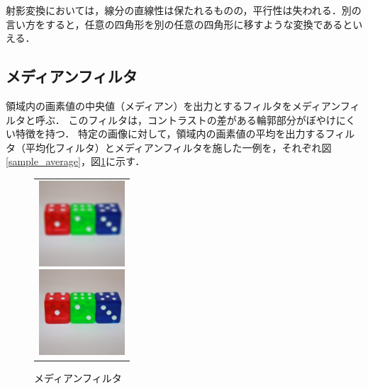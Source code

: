 \documentclass[openright]{nitocs}
\numberwithin{equation}{section}
\begin{document}
                射影変換においては，線分の直線性は保たれるものの，平行性は失われる．別の言い方をすると，任意の四角形を別の任意の四角形に移すような変換であるといえる．

        \subsection{メディアンフィルタ}
            領域内の画素値の中央値（メディアン）を出力とするフィルタをメディアンフィルタと呼ぶ．
            このフィルタは，コントラストの差がある輪郭部分がぼやけにくい特徴を持つ．
            特定の画像に対して，領域内の画素値の平均を出力するフィルタ（平均化フィルタ）とメディアンフィルタを施した一例を，それぞれ図\ref{sample_average}，図\ref{sample_median}に示す．
            \begin{figure}[htbp] %
                \begin{center}
                  \begin{tabular}{c}
                    \begin{minipage}{0.5\hsize}
                      \begin{center}
                        \includegraphics[width=32mm,height=32mm]{sample_average.jpg}
                    \caption{平均化フィルタ}
                    \label{sample_average}
                      \end{center}
                    \end{minipage}
                    \begin{minipage}{0.5\hsize}
                      \begin{center}
                        \includegraphics[width=32mm,height=32mm]{sample_median.jpg}
                    \caption{メディアンフィルタ}
                    \label{sample_median}
                      \end{center}
                    \end{minipage}
                  \end{tabular}
                \end{center}
            \end{figure}
\end{document}
